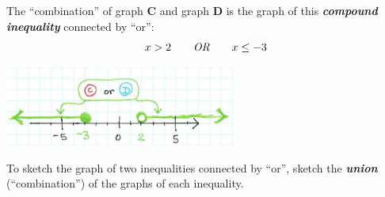 \begin{myExample}{
    The ``combination'' of graph {\sffamily\bfseries C} and graph {\sffamily\bfseries D} 
    is the graph of this {\bfseries\itshape compound inequality} connected by ``or'':
    \[
        x > 2 \qquad \text{\itshape OR} \qquad x \leq -3
    \]
}
    \begin{center}
        \includegraphics[width=3in]{or-4.jpg}
    \end{center}
\end{myExample}

\begin{center}
\begin{tcolorbox}[width=5.5in]
    To sketch the graph of two inequalities connected by ``or'',
    sketch the {\bfseries\itshape union} (``combination'') of the graphs of each inequality.
\end{tcolorbox}
\end{center}